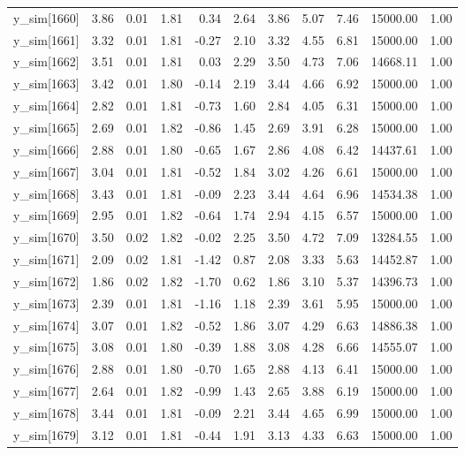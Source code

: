 \begin{table}[ht]
\begin{tabular}{rrrrrrrrrrr}
  y\_sim[1660] & 3.86 & 0.01 & 1.81 & 0.34 & 2.64 & 3.86 & 5.07 & 7.46 & 15000.00 & 1.00 \\ 
  y\_sim[1661] & 3.32 & 0.01 & 1.81 & -0.27 & 2.10 & 3.32 & 4.55 & 6.81 & 15000.00 & 1.00 \\ 
  y\_sim[1662] & 3.51 & 0.01 & 1.81 & 0.03 & 2.29 & 3.50 & 4.73 & 7.06 & 14668.11 & 1.00 \\ 
  y\_sim[1663] & 3.42 & 0.01 & 1.80 & -0.14 & 2.19 & 3.44 & 4.66 & 6.92 & 15000.00 & 1.00 \\ 
  y\_sim[1664] & 2.82 & 0.01 & 1.81 & -0.73 & 1.60 & 2.84 & 4.05 & 6.31 & 15000.00 & 1.00 \\ 
  y\_sim[1665] & 2.69 & 0.01 & 1.82 & -0.86 & 1.45 & 2.69 & 3.91 & 6.28 & 15000.00 & 1.00 \\ 
  y\_sim[1666] & 2.88 & 0.01 & 1.80 & -0.65 & 1.67 & 2.86 & 4.08 & 6.42 & 14437.61 & 1.00 \\ 
  y\_sim[1667] & 3.04 & 0.01 & 1.81 & -0.52 & 1.84 & 3.02 & 4.26 & 6.61 & 15000.00 & 1.00 \\ 
  y\_sim[1668] & 3.43 & 0.01 & 1.81 & -0.09 & 2.23 & 3.44 & 4.64 & 6.96 & 14534.38 & 1.00 \\ 
  y\_sim[1669] & 2.95 & 0.01 & 1.82 & -0.64 & 1.74 & 2.94 & 4.15 & 6.57 & 15000.00 & 1.00 \\ 
  y\_sim[1670] & 3.50 & 0.02 & 1.82 & -0.02 & 2.25 & 3.50 & 4.72 & 7.09 & 13284.55 & 1.00 \\ 
  y\_sim[1671] & 2.09 & 0.02 & 1.81 & -1.42 & 0.87 & 2.08 & 3.33 & 5.63 & 14452.87 & 1.00 \\ 
  y\_sim[1672] & 1.86 & 0.02 & 1.82 & -1.70 & 0.62 & 1.86 & 3.10 & 5.37 & 14396.73 & 1.00 \\ 
  y\_sim[1673] & 2.39 & 0.01 & 1.81 & -1.16 & 1.18 & 2.39 & 3.61 & 5.95 & 15000.00 & 1.00 \\ 
  y\_sim[1674] & 3.07 & 0.01 & 1.82 & -0.52 & 1.86 & 3.07 & 4.29 & 6.63 & 14886.38 & 1.00 \\ 
  y\_sim[1675] & 3.08 & 0.01 & 1.80 & -0.39 & 1.88 & 3.08 & 4.28 & 6.66 & 14555.07 & 1.00 \\ 
  y\_sim[1676] & 2.88 & 0.01 & 1.80 & -0.70 & 1.65 & 2.88 & 4.13 & 6.41 & 15000.00 & 1.00 \\ 
  y\_sim[1677] & 2.64 & 0.01 & 1.82 & -0.99 & 1.43 & 2.65 & 3.88 & 6.19 & 15000.00 & 1.00 \\ 
  y\_sim[1678] & 3.44 & 0.01 & 1.81 & -0.09 & 2.21 & 3.44 & 4.65 & 6.99 & 15000.00 & 1.00 \\ 
  y\_sim[1679] & 3.12 & 0.01 & 1.81 & -0.44 & 1.91 & 3.13 & 4.33 & 6.63 & 15000.00 & 1.00 \\ 

\end{tabular}
\end{table}

